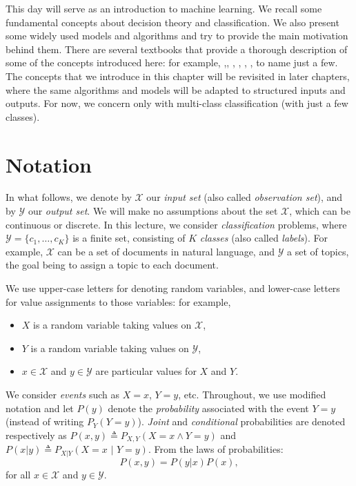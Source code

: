 
This day will serve as an introduction to machine learning. We recall some fundamental concepts 
about decision theory and classification. We also present some widely used models and algorithms 
and try to provide the main motivation behind them. 
There are several textbooks that provide a thorough description of some of the concepts introduced here: 
for example, \citet{Mitchell1997},\citet{Duda2001}, \citet{Schoelkopf2002}, \citet{Joachims2002}, \citet{Bishop2006}, \citet{Manning2008}, 
to name just a few.  
The concepts that we introduce in this chapter will be revisited in later chapters, where the same algorithms and models 
will be adapted to structured inputs and outputs. For now, we concern only with multi-class classification 
(with just a few classes). 

\section{Notation}

In what follows, we denote by $\mathcal{X}$ our \emph{input set} (also called \emph{observation set}), and by $\mathcal{Y}$ our \emph{output set}. 
We will make no assumptions about the set $\mathcal{X}$, which can be continuous or discrete. In this lecture, we 
consider \emph{classification} problems, where $\mathcal{Y} = \{c_1,\ldots,c_K\}$ is a finite set, consisting of $K$ \emph{classes} (also called \emph{labels}). 
For example, $\mathcal{X}$ can be a set of documents in natural language, and $\mathcal{Y}$ a set of topics, the goal 
being to assign a topic to each document. 

We use upper-case letters for denoting random variables, and lower-case letters for value assignments to those variables:  
for example, 
\begin{itemize}
\item $X$ is a random variable taking values on $\mathcal{X}$,
\item $Y$ is a random variable taking values on $\mathcal{Y}$,
\item $x \in \mathcal{X}$ and $y \in \mathcal{Y}$ are particular values for $X$ and $Y$. 
\end{itemize}  
We consider \emph{events} such as $X=x$, $Y=y$, etc. 
Throughout, we use modified notation and let $P(y)$ denote the \emph{probability} associated with the event $Y=y$ (instead of writing $P_Y(Y=y)$). 
\emph{Joint} and \emph{conditional} probabilities are 
denoted respectively as $P(x,y) \triangleq P_{X,Y}(X=x \wedge Y=y)$ and $P(x|y) \triangleq P_{X|Y}(X=x \,\,|\,\,Y=y)$. From the laws of probabilities: 
\begin{equation}
P(x,y)=P(y|x) P(x), 
\end{equation}
for all $x \in \mathcal{X}$ and $y \in \mathcal{Y}$.

